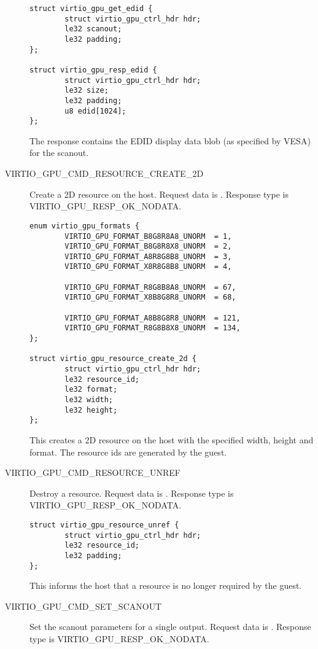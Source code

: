 \begin{description}
\begin{lstlisting}
struct virtio_gpu_get_edid {
        struct virtio_gpu_ctrl_hdr hdr;
        le32 scanout;
        le32 padding;
};

struct virtio_gpu_resp_edid {
        struct virtio_gpu_ctrl_hdr hdr;
        le32 size;
        le32 padding;
        u8 edid[1024];
};
\end{lstlisting}

The response contains the EDID display data blob (as specified by
VESA) for the scanout.

\item[VIRTIO_GPU_CMD_RESOURCE_CREATE_2D] Create a 2D resource on the
  host.  Request data is .
  Response type is VIRTIO_GPU_RESP_OK_NODATA.

\begin{lstlisting}
enum virtio_gpu_formats {
        VIRTIO_GPU_FORMAT_B8G8R8A8_UNORM  = 1,
        VIRTIO_GPU_FORMAT_B8G8R8X8_UNORM  = 2,
        VIRTIO_GPU_FORMAT_A8R8G8B8_UNORM  = 3,
        VIRTIO_GPU_FORMAT_X8R8G8B8_UNORM  = 4,

        VIRTIO_GPU_FORMAT_R8G8B8A8_UNORM  = 67,
        VIRTIO_GPU_FORMAT_X8B8G8R8_UNORM  = 68,

        VIRTIO_GPU_FORMAT_A8B8G8R8_UNORM  = 121,
        VIRTIO_GPU_FORMAT_R8G8B8X8_UNORM  = 134,
};

struct virtio_gpu_resource_create_2d {
        struct virtio_gpu_ctrl_hdr hdr;
        le32 resource_id;
        le32 format;
        le32 width;
        le32 height;
};
\end{lstlisting}

This creates a 2D resource on the host with the specified width,
height and format.  The resource ids are generated by the guest.

\item[VIRTIO_GPU_CMD_RESOURCE_UNREF] Destroy a resource.  Request data
  is .  Response type is
  VIRTIO_GPU_RESP_OK_NODATA.

\begin{lstlisting}
struct virtio_gpu_resource_unref {
        struct virtio_gpu_ctrl_hdr hdr;
        le32 resource_id;
        le32 padding;
};
\end{lstlisting}

This informs the host that a resource is no longer required by the
guest.

\item[VIRTIO_GPU_CMD_SET_SCANOUT] Set the scanout parameters for a
  single output.  Request data is .  Response type is
  VIRTIO_GPU_RESP_OK_NODATA.


\end{description}
